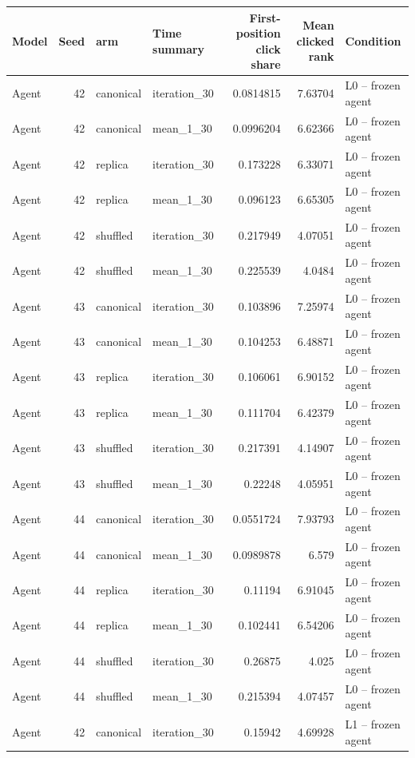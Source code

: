\begin{table}[htbp!]
\centering
\small
\setlength{\tabcolsep}{3pt}
\renewcommand{\arraystretch}{1.1}
\begin{tabular}{lrllrrl}
\hline
Model & Seed & arm & Time summary & First-position click share & Mean clicked rank & Condition \\
\hline
Agent & 42 & canonical & iteration\_30 & 0.0814815 & 7.63704 & L0 -- frozen agent \\
Agent & 42 & canonical & mean\_1\_30 & 0.0996204 & 6.62366 & L0 -- frozen agent \\
Agent & 42 & replica & iteration\_30 & 0.173228 & 6.33071 & L0 -- frozen agent \\
Agent & 42 & replica & mean\_1\_30 & 0.096123 & 6.65305 & L0 -- frozen agent \\
Agent & 42 & shuffled & iteration\_30 & 0.217949 & 4.07051 & L0 -- frozen agent \\
Agent & 42 & shuffled & mean\_1\_30 & 0.225539 & 4.0484 & L0 -- frozen agent \\
Agent & 43 & canonical & iteration\_30 & 0.103896 & 7.25974 & L0 -- frozen agent \\
Agent & 43 & canonical & mean\_1\_30 & 0.104253 & 6.48871 & L0 -- frozen agent \\
Agent & 43 & replica & iteration\_30 & 0.106061 & 6.90152 & L0 -- frozen agent \\
Agent & 43 & replica & mean\_1\_30 & 0.111704 & 6.42379 & L0 -- frozen agent \\
Agent & 43 & shuffled & iteration\_30 & 0.217391 & 4.14907 & L0 -- frozen agent \\
Agent & 43 & shuffled & mean\_1\_30 & 0.22248 & 4.05951 & L0 -- frozen agent \\
Agent & 44 & canonical & iteration\_30 & 0.0551724 & 7.93793 & L0 -- frozen agent \\
Agent & 44 & canonical & mean\_1\_30 & 0.0989878 & 6.579 & L0 -- frozen agent \\
Agent & 44 & replica & iteration\_30 & 0.11194 & 6.91045 & L0 -- frozen agent \\
Agent & 44 & replica & mean\_1\_30 & 0.102441 & 6.54206 & L0 -- frozen agent \\
Agent & 44 & shuffled & iteration\_30 & 0.26875 & 4.025 & L0 -- frozen agent \\
Agent & 44 & shuffled & mean\_1\_30 & 0.215394 & 4.07457 & L0 -- frozen agent \\
Agent & 42 & canonical & iteration\_30 & 0.15942 & 4.69928 & L1 -- frozen agent \\

\end{tabular}
\end{table}
